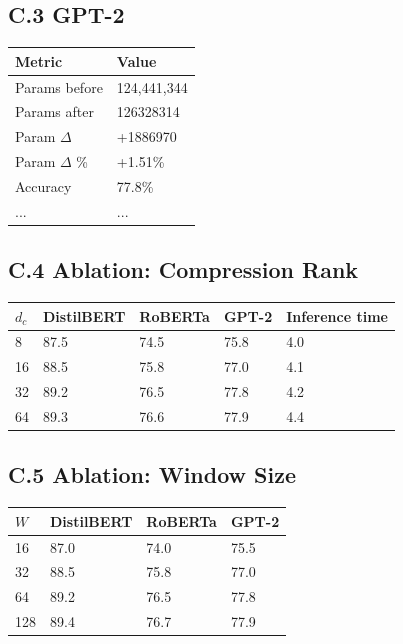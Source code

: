 \subsection{C.3 GPT-2}

\begin{table}[H]
\centering
\small
\begin{tabular}{ll}
\toprule
\textbf{Metric} & \textbf{Value} \\
\midrule
Params before & 124,441,344 \\
Params after & 126328314 \\
Param $\Delta$ & +1886970 \\
Param $\Delta$ \% & +1.51\% \\
Accuracy & 77.8\% \\
... & ... \\
\bottomrule
\end{tabular}
\end{table}

\subsection{C.4 Ablation: Compression Rank}

\begin{table}[H]
\centering
\small
\begin{tabular}{lllll}
\toprule
\textbf{$d_c$} & \textbf{DistilBERT} & \textbf{RoBERTa} & \textbf{GPT-2} & \textbf{Inference time} \\
\midrule
8 & 87.5 & 74.5 & 75.8 & 4.0 \\
16 & 88.5 & 75.8 & 77.0 & 4.1 \\
32 & 89.2 & 76.5 & 77.8 & 4.2 \\
64 & 89.3 & 76.6 & 77.9 & 4.4 \\
\bottomrule
\end{tabular}
\end{table}

\subsection{C.5 Ablation: Window Size}

\begin{table}[H]
\centering
\small
\begin{tabular}{llll}
\toprule
\textbf{$W$} & \textbf{DistilBERT} & \textbf{RoBERTa} & \textbf{GPT-2} \\
\midrule
16 & 87.0 & 74.0 & 75.5 \\
32 & 88.5 & 75.8 & 77.0 \\
64 & 89.2 & 76.5 & 77.8 \\
128 & 89.4 & 76.7 & 77.9 \\
\bottomrule
\end{tabular}
\end{table}


